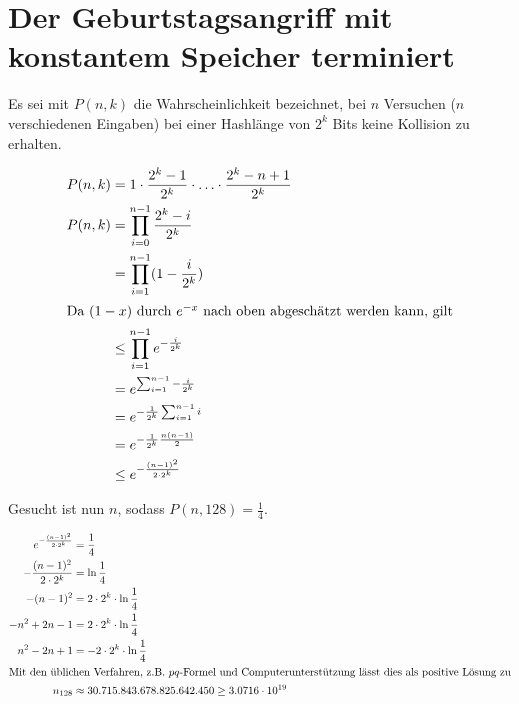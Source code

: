 \documentclass{../crypto}
\date{4. Dezember 2015}
\begin{document}
\maketitle

\section{Der Geburtstagsangriff mit konstantem Speicher terminiert}

Es sei mit $P(n,k)$ die Wahrscheinlichkeit bezeichnet, bei $n$ Versuchen ($n$
verschiedenen Eingaben) bei einer Hashlänge von $2^k$ Bits keine Kollision zu
erhalten.

\begin{align*}
   P(n,k)  & = 1 \cdot \frac{2^k - 1}{2^k} \cdot \ldots \cdot \frac{2^k - n + 1}{2^k} \\
   P(n,k)  & =   \prod_{i=0}^{n-1} \frac{2^k - i}{2^k}                                \\
           & =   \prod_{i=1}^{n-1} (1 -  \frac{i}{2^k})                               \\
\intertext{Da $(1-x)$ durch $e^{-x}$ nach oben abgeschätzt werden kann, gilt}
           & \le \prod_{i=1}^{n-1} e^{-\frac{i}{2^k}} \\
           & =   e^{\sum_{i=1}^{n-1}-\frac{i}{2^k}}   \\
           & =   e^{-\frac{1}{2^k}\sum_{i=1}^{n-1}i}  \\
           & =   e^{-\frac{1}{2^k} \frac{n(n-1)}{2}}  \\
           & \le   e^{-\frac{(n-1)^2}{2\cdot 2^k}}    \\
\end{align*}

Gesucht ist nun $n$, sodass $P(n,128) = \frac{1}{4}$.

\begin{align*}
   e^{-\frac{(n-1)^2}{2\cdot 2^k}} & = \frac{1}{4}                        \\
   -\frac{(n-1)^2}{2\cdot 2^k}     & = \ln{\frac{1}{4}}                   \\
   -(n-1)^2                        & = 2\cdot 2^k \cdot \ln{\frac{1}{4}}  \\
   -n^2 + 2n - 1                   & = 2\cdot 2^k \cdot \ln{\frac{1}{4}}  \\
   n^2 - 2n + 1                    & = -2\cdot 2^k \cdot \ln{\frac{1}{4}} \\
   \intertext{Mit den üblichen Verfahren, z.B. $pq$-Formel und
   Computerunterstützung lässt dies als positive Lösung zu}
   n_{128}                         & \approx 30.715.843.678.825.642.450 \ge 3.0716 \cdot 10^{19}
\end{align*}
\end{document}
